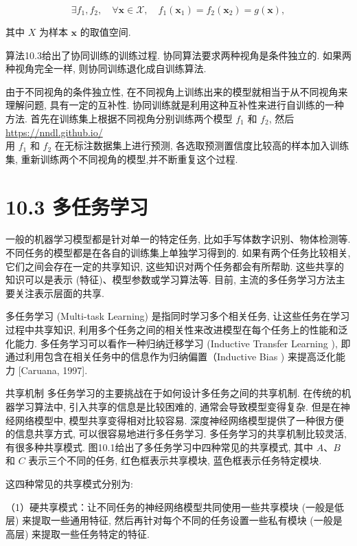 \documentclass[10pt]{article}
\begin{document}
\begin{equation*}
\exists f_{1}, f_{2}, \quad \forall \boldsymbol{x} \in \mathcal{X}, \quad f_{1}\left(\boldsymbol{x}_{1}\right)=f_{2}\left(\boldsymbol{x}_{2}\right)=g(\boldsymbol{x}), \tag{10.23}
\end{equation*}


其中 $X$ 为样本 $\boldsymbol{x}$ 的取值空间.

算法10.3给出了协同训练的训练过程. 协同算法要求两种视角是条件独立的. 如果两种视角完全一样, 则协同训练退化成自训练算法.



由于不同视角的条件独立性, 在不同视角上训练出来的模型就相当于从不同视角来理解问题, 具有一定的互补性. 协同训练就是利用这种互补性来进行自训练的一种方法. 首先在训练集上根据不同视角分别训练两个模型 $f_{1}$ 和 $f_{2}$, 然后 \href{https://nndl.github.io/}{https://nndl.github.io/}\\
用 $f_{1}$ 和 $f_{2}$ 在无标注数据集上进行预测, 各选取预测置信度比较高的样本加入训练集, 重新训练两个不同视角的模型,并不断重复这个过程.

\section*{10.3 多任务学习}
一般的机器学习模型都是针对单一的特定任务, 比如手写体数字识别、物体检测等. 不同任务的模型都是在各自的训练集上单独学习得到的. 如果有两个任务比较相关, 它们之间会存在一定的共享知识, 这些知识对两个任务都会有所帮助. 这些共享的知识可以是表示 (特征)、模型参数或学习算法等. 目前, 主流的多任务学习方法主要关注表示层面的共享.

多任务学习 (Multi-task Learning) 是指同时学习多个相关任务, 让这些任务在学习过程中共享知识, 利用多个任务之间的相关性来改进模型在每个任务上的性能和泛化能力. 多任务学习可以看作一种归纳迁移学习 (Inductive Transfer Learning ), 即通过利用包含在相关任务中的信息作为归纳偏置（Inductive Bias ) 来提高泛化能力 [Caruana, 1997].

共享机制 多任务学习的主要挑战在于如何设计多任务之间的共享机制. 在传统的机器学习算法中, 引入共享的信息是比较困难的, 通常会导致模型变得复杂. 但是在神经网络模型中, 模型共享变得相对比较容易. 深度神经网络模型提供了一种很方便的信息共享方式, 可以很容易地进行多任务学习. 多任务学习的共享机制比较灵活, 有很多种共享模式. 图10.1给出了多任务学习中四种常见的共享模式, 其中 $A 、 B$ 和 $C$ 表示三个不同的任务, 红色框表示共享模块, 蓝色框表示任务特定模块.

这四种常见的共享模式分别为:

（1）硬共享模式：让不同任务的神经网络模型共同使用一些共享模块 (一般是低层) 来提取一些通用特征, 然后再针对每个不同的任务设置一些私有模块 (一般是高层) 来提取一些任务特定的特征.
\end{document}
